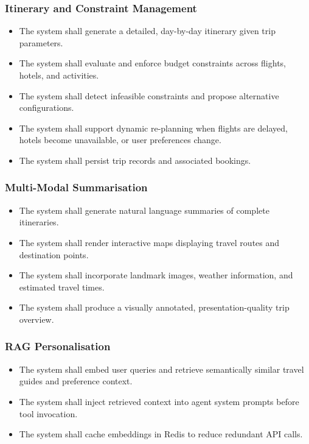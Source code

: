 \documentclass[12pt, a4paper]{article}
\begin{document}
\subsubsection{Itinerary and Constraint Management}
\begin{itemize}[leftmargin=1.5cm, itemsep=0.3em]
  \item The system shall generate a detailed, day-by-day itinerary given trip parameters.
  \item The system shall evaluate and enforce budget constraints across flights, hotels, and activities.
  \item The system shall detect infeasible constraints and propose alternative configurations.
  \item The system shall support dynamic re-planning when flights are delayed, hotels become unavailable, or user preferences change.
  \item The system shall persist trip records and associated bookings.
\end{itemize}

\subsubsection{Multi-Modal Summarisation}
\begin{itemize}[leftmargin=1.5cm, itemsep=0.3em]
  \item The system shall generate natural language summaries of complete itineraries.
  \item The system shall render interactive maps displaying travel routes and destination points.
  \item The system shall incorporate landmark images, weather information, and estimated travel times.
  \item The system shall produce a visually annotated, presentation-quality trip overview.
\end{itemize}

\subsubsection{RAG Personalisation}
\begin{itemize}[leftmargin=1.5cm, itemsep=0.3em]
  \item The system shall embed user queries and retrieve semantically similar travel guides and preference context.
  \item The system shall inject retrieved context into agent system prompts before tool invocation.
  \item The system shall cache embeddings in Redis to reduce redundant API calls.
\end{itemize}
\end{document}

